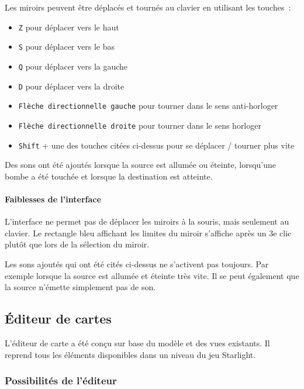 \documentclass[]{report}
\begin{document}
Les miroirs peuvent être déplacés et tournés au clavier en utilisant les touches~:

\begin{itemize}
	\item \texttt{Z} pour déplacer vers le haut
	\item \texttt{S} pour déplacer vers le bas
	\item \texttt{Q} pour déplacer vers la gauche
	\item \texttt{D} pour déplacer vers la droite
	\item \texttt{Flèche directionnelle gauche} pour tourner dans le sens
		anti-horloger
	\item \texttt{Flèche directionnelle droite} pour tourner dans le sens
		horloger
    \item \texttt{Shift} + une des touches citées ci-dessus pour se déplacer / tourner
        plus vite
\end{itemize}

Des sons ont été ajoutés lorsque la source est allumée ou éteinte, 
lorsqu'une bombe a été touchée et lorsque la destination
est atteinte.

\paragraph{Faiblesses de l'interface} 

L'interface ne permet pas de déplacer les miroirs à la souris, mais seulement au clavier.
Le rectangle bleu affichant les limites du miroir s'affiche après un 3e clic plutôt 
que lors de la sélection du miroir.

Les sons ajoutés qui ont été cités ci-dessus ne s'activent pas toujours.
Par exemple lorsque la source est allumée et éteinte très vite.
Il se peut également que la source n'émette simplement pas de son.

\newpage
\subsection{\label{Editeur}Éditeur de cartes}

L’éditeur de carte a été conçu sur base du modèle et des vues existants.
Il reprend tous les éléments disponibles dans un niveau du jeu Starlight.

\subsubsection{Possibilités de l’éditeur}
\end{document}
